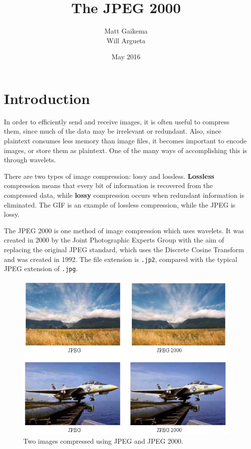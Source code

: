 \documentclass[12pt]{article}
\title{The JPEG 2000}
\author{Matt Gaikema \\ Will Argueta}
\date{May 2016}
\begin{document}
\maketitle

\section{Introduction}

In order to efficiently send and receive images, it is often useful to compress them, 
since much of the data may be irrelevant or redundant.
Also, since plaintext consumes less memory than image files, it becomes important to encode images,
or store them as plaintext.
One of the many ways of accomplishing this is through wavelets.

There are two types of image compression: lossy and lossless.
\textbf{Lossless} compression means that every bit of information is recovered from the compressed data,
while \textbf{lossy} compression occurs when redundant information is eliminated.
The GIF is an example of lossless compression, while the JPEG is lossy.

The JPEG 2000 is one method of image compression which uses wavelets.
It was created in 2000 by the Joint Photographic Experts Group with the aim of replacing the original JPEG standard, 
which uses the Discrete Cosine Transform and was created in 1992.
The file extension is \verb|.jp2|, compared with the typical JPEG extension of \verb|.jpg|.

\begin{figure}[h]
	\centering
	\includegraphics[scale=0.4]{resources/comparison.png}
	\caption{Two images compressed using JPEG and JPEG 2000.\cite{comparison}}
	\label{fig:compare}
\end{figure}
\end{document}
